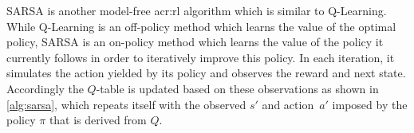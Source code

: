 SARSA \cite{sutton1998reinforcement} is another model-free \acrshort{acr:rl} algorithm which is similar to Q-Learning.
While Q-Learning is an off-policy method which learns the value of the optimal policy, SARSA is an on-policy method which learns the value of the policy it currently follows in order to iteratively improve this policy.
In each iteration, it simulates the action yielded by its policy and observes the reward and next state.
Accordingly the $Q$-table is updated based on these observations as shown in \autoref{alg:sarsa}, which repeats itself with the observed $s'$ and action~$a'$ imposed by the policy $\pi$ that is derived from $Q$.

